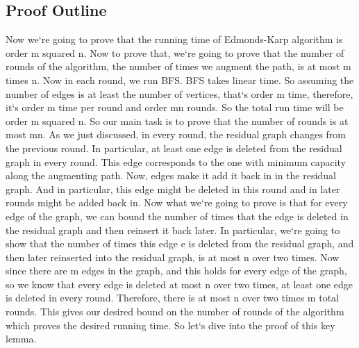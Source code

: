 \subsection{Proof Outline}
Now we`re going to prove that the running time of Edmonds-Karp algorithm is order m squared n.
Now to prove that, we`re going to prove that the number of rounds of the algorithm, the number of times we augment the path, is at most m times n.
Now in each round, we run BFS\@.
BFS takes linear time.
So assuming the number of edges is at least the number of vertices, that`s order m time, therefore, it`s order m time per round and order mn rounds.
So the total run time will be order m squared n.
So our main task is to prove that the number of rounds is at most mn.
As we just discussed, in every round, the residual graph changes from the previous round.
In particular, at least one edge is deleted from the residual graph in every round.
This edge corresponds to the one with minimum capacity along the augmenting path.
Now, edges make it add it back in in the residual graph.
And in particular, this edge might be deleted in this round and in later rounds might be added back in.
Now what we`re going to prove is that for every edge of the graph, we can bound the number of times that the edge is deleted in the residual graph and then reinsert it back later.
In particular, we`re going to show that the number of times this edge e is deleted from the residual graph, and then later reinserted into the residual graph, is at most n over two times.
Now since there are m edges in the graph, and this holds for every edge of the graph, so we know that every edge is deleted at most n over two times, at least one edge is deleted in every round.
Therefore, there is at most n over two times m total rounds.
This gives our desired bound on the number of rounds of the algorithm which proves the desired running time.
So let`s dive into the proof of this key lemma.

